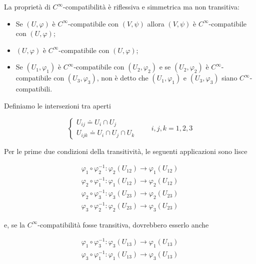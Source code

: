 \begin{remark}
	La proprietà di $ C^{\infty} $-compatibilità è riflessiva e simmetrica ma non transitiva:
	
	\begin{itemize}
		\item Se $ (U,\varphi) $ è $ C^{\infty} $-compatibile con $ (V,\psi) $ allora $ (V,\psi) $ è $ C^{\infty} $-compatibile con $ (U,\varphi) $;
		
		\item $ (U,\varphi) $ è $ C^{\infty} $-compatibile con $ (U,\varphi) $;
		
		\item Se $ (U_{1},\varphi_{1}) $ è $ C^{\infty} $-compatibile con $ (U_{2},\varphi_{2}) $ e se $ (U_{2},\varphi_{2}) $ è $ C^{\infty} $-compatibile con $ (U_{3},\varphi_{3}) $, non è detto che $ (U_{1},\varphi_{1}) $ e $ (U_{3},\varphi_{3}) $ siano $ C^{\infty} $-compatibili.
	\end{itemize}
\end{remark}

Definiamo le intersezioni tra aperti

\begin{equation}
	\begin{cases}
		U_{ij} \doteq U_{i} \cap U_{j} \\
		U_{ijk} \doteq U_{i} \cap U_{j} \cap U_{k}
	\end{cases} %
	\qquad i,j,k=1,2,3
\end{equation}

Per le prime due condizioni della transitività, le seguenti applicazioni sono lisce

\begin{gather}
	\varphi_{1} \circ \varphi_{2}^{-1} : \varphi_{2}(U_{12}) \to \varphi_{1}(U_{12}) \\
	\varphi_{2} \circ \varphi_{1}^{-1} : \varphi_{1}(U_{12}) \to \varphi_{2}(U_{12}) \\
	\varphi_{2} \circ \varphi_{3}^{-1} : \varphi_{3}(U_{23}) \to \varphi_{2}(U_{23}) \\
	\varphi_{3} \circ \varphi_{2}^{-1} : \varphi_{2}(U_{23}) \to \varphi_{3}(U_{23})
\end{gather}

e, se la $ C^{\infty} $-compatibilità fosse transitiva, dovrebbero esserlo anche

\begin{gather}
	\varphi_{1} \circ \varphi_{3}^{-1} : \varphi_{3}(U_{13}) \to \varphi_{1}(U_{13}) \\
	\varphi_{3} \circ \varphi_{1}^{-1} : \varphi_{1}(U_{13}) \to \varphi_{3}(U_{13})
\end{gather}

